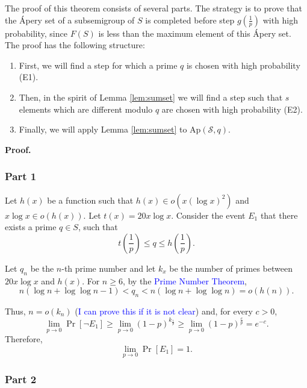 \par The proof of this theorem consists of several parts. The strategy is to prove that the Ápery set of a subsemigroup of $S$ is completed before step $g\left(\frac{1}{p}\right)$ with high probability, since $F(S)$ is less than the maximum element of this Ápery set. The proof has the following structure: 
\begin{enumerate}
\item First, we will find a step for which a prime $q$ is chosen with high probability (E1). 
\item Then, in the spirit of Lemma \ref{lem:sumset} we will find a step such that $s$ elements which are different modulo $q$ are chosen with high probability (E2). 
\item Finally, we will apply Lemma \ref{lem:sumset} to $\mathrm{Ap}(\mathcal{S}, q)$.
\end{enumerate}
\textbf{Proof. }
\subsubsection*{Part 1}
Let \(h(x)\) be a function such that \(h(x) \in o(x (\log x)^2)\) and \(x\log x \in o(h(x))\). Let $t(x) = 20x \log x$. Consider the event
$E_1$ that there exists a prime $q \in S$, such that 
\[t\left(\frac{1}{p}\right) \leq q \leq h\left(\frac{1}{p}\right).\]
\par 
Let $q_n$ be the $n$-th prime number and let $k_x$ be the number of primes between $20x\log x$ and $h(x)$. For $n \geq 6$, by the \textcolor{blue}{Prime Number Theorem}, 
\[n(\log n + \log \log n - 1) < q_n < n(\log n + \log\log n) = o(h(n)).\]

\par Thus, $n = o(k_n)$ (\textcolor{blue}{I can prove this if it is not clear}) and, for every $c > 0$,  
\[\lim_{p \to 0}\Pr[\lnot E_1] \geq \lim_{p \to 0} (1 - p)^{k_{\frac{1}{p}}} \geq \lim_{p \to 0} (1 - p)^{\frac{c}{p}} = e^{-c}.\]
Therefore, 
\[\lim_{p \to 0}\Pr[E_1] = 1.\]
\subsubsection*{Part 2}

